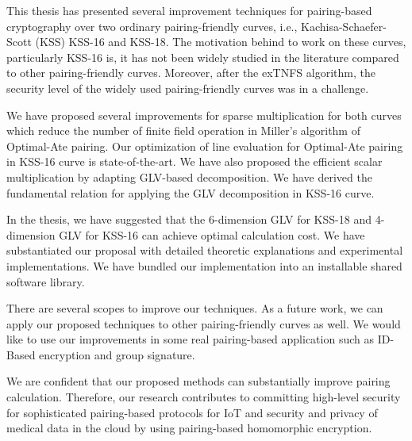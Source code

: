 This thesis has presented several improvement techniques for pairing-based cryptography over two ordinary pairing-friendly curves, i.e., Kachisa-Schaefer-Scott (KSS) KSS-16 and KSS-18. 
The motivation behind to work on these curves, particularly KSS-16 is, it has not been widely studied in the literature compared to other pairing-friendly curves. 
Moreover, after the exTNFS algorithm, the security level of the widely used pairing-friendly curves was in a challenge.


We have proposed several improvements for sparse multiplication for both curves which reduce the number of finite field operation in Miller's algorithm of Optimal-Ate pairing. 
Our optimization of line evaluation for Optimal-Ate pairing in KSS-16 curve is state-of-the-art. 
We have also proposed the efficient scalar multiplication by adapting GLV-based decomposition. 
We have derived the fundamental relation for applying the GLV decomposition in KSS-16 curve. 


In the thesis, we have suggested that the 6-dimension GLV for KSS-18 and 4-dimension GLV for KSS-16 can achieve optimal calculation cost. 
We have substantiated our proposal with detailed theoretic explanations and experimental implementations. 
We have bundled our implementation into an installable shared software library. 

There are several scopes to improve our techniques. As a future work, we can apply our proposed techniques to other pairing-friendly curves as well. We would like to use our improvements in some real pairing-based application such as ID-Based encryption and group signature. 


We are confident that our proposed methods can substantially improve pairing calculation. 
Therefore, our research contributes to committing high-level security for sophisticated pairing-based protocols for IoT and security and privacy of medical data in the cloud by using pairing-based homomorphic encryption.















